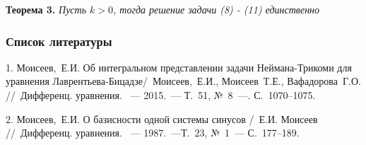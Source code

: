 \documentclass{beamer}
\begin{document}
\begin{frame}
		\textbf{Теорема 3.} \textit{Пусть $k > 0$, тогда решение задачи (8) - (11) единственно} \newline

\end{frame}


	
	
		\begin{frame}
		\frametitle{Список литературы}
			1. Моисеев,~Е.И. Об интегральном представлении задачи Неймана-Трикоми для уравнения Лаврентьева-Бицадзе/~Моисеев,~Е.И., Моисеев~Т.Е., Вафадорова~Г.О. //~Дифференц. уравнения. ~--- 2015.~--- Т.~51, №~8~---. С.~1070--1075.
		
		2. Моисеев,~Е.И.  О базисности одной системы синусов /~Е.И. Моисеев //~Дифференц. уравнения. ~--- 1987.~---Т.~23,  №~1~--- С.~177--189.
	\end{frame}
	
	
\end{document}
